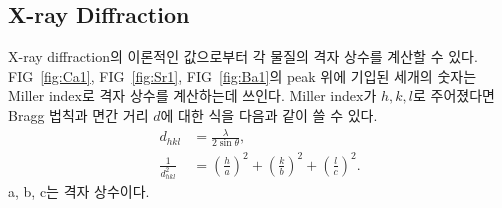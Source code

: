 \documentclass[aps,reprint,superscriptaddress,10pt]{revtex4-2}
\begin{document}
\subsection{X-ray Diffraction}
X-ray diffraction의 이론적인 값으로부터 각 물질의 격자 상수를 계산할 수 있다.
FIG~\ref{fig:Ca1}, FIG~\ref{fig:Sr1}, FIG~\ref{fig:Ba1}의 peak 위에 기입된
세개의 숫자는 Miller index로 격자 상수를 계산하는데 쓰인다. Miller index가 
$h,k,l$로 주어졌다면 Bragg 법칙과 면간 거리 $d$에 대한 식을 다음과 같이 쓸 수 있다.
\begin{align}
  \label{eq:1} d_{hkl} &= \frac{\lambda}{2\sin\theta},\,\,\,  \\
  \label{eq:2} \frac{1}{d_{hkl}^2} &=\left(\frac{h}{a}\right)^2
  +\left(\frac{k}{b}\right)^2+\left(\frac{l}{c}\right)^2.
\end{align}
a, b, c는 격자 상수이다.
\newpage
\end{document}
